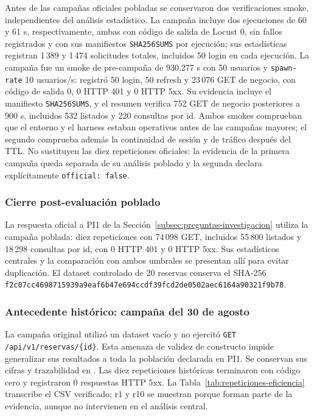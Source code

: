 Antes de las campañas oficiales pobladas se conservaron dos verificaciones
smoke, independientes del análisis estadístico. La campaña
incluye dos ejecuciones de 60 y 61 s, respectivamente, ambas con código de
salida de Locust 0, sin fallos registrados y con sus manifiestos
\texttt{SHA256SUMS} por ejecución; sus estadísticas registran 1\,389 y 1\,474
solicitudes totales, incluidos 50 login en cada ejecución. La campaña
fue un smoke de pre-campaña de 930,277 s con 50 usuarios y
\texttt{spawn-rate} 10 usuarios/s: registró 50 login, 50 refresh y 23\,076 GET
de negocio, con código de salida 0, 0 HTTP 401 y 0 HTTP 5xx. Su evidencia
incluye el manifiesto \texttt{SHA256SUMS}, y el resumen verifica 752 GET de
negocio posteriores a 900 s, incluidos 532 listados y 220 consultas por id.
Ambos smokes comprueban que el entorno y el harness estaban operativos antes
de las campañas mayores; el segundo comprueba además la continuidad de sesión
y de tráfico después del TTL. No sustituyen las diez repeticiones oficiales:
la evidencia de la primera campaña queda separada de su análisis poblado y la
segunda declara explícitamente \texttt{official: false}.

\subsubsection{Cierre post-evaluación poblado}

La respuesta oficial a PI1 de la
Sección~\ref{subsec:preguntas-investigacion} utiliza la campaña poblada:
diez repeticiones con 74\,098 GET, incluidos 55\,800 listados y 18\,298
consultas por id, con 0 HTTP 401 y 0 HTTP 5xx. Sus estadísticos centrales y
la comparación con ambos umbrales se presentan allí para evitar duplicación.
El dataset controlado de 20 reservas conserva el SHA-256
\texttt{f2c07cc4698715939a9eaf6b47e694ccdf39fcd2de0502aec6164a90321f9b78}.

\subsubsection{Antecedente histórico: campaña del 30 de agosto}

La campaña original utilizó un dataset vacío y no ejercitó
\texttt{GET /api/v1/reservas/\{id\}}. Esta amenaza de validez de constructo
impide generalizar sus resultados a toda la población declarada en PI1.
Se conservan sus cifras y trazabilidad en
.
Las diez repeticiones históricas terminaron con código cero y registraron 0 respuestas HTTP
5xx. La Tabla~\ref{tab:repeticiones-eficiencia} transcribe el CSV verificado; r1
y r10 se muestran porque forman parte de la evidencia, aunque no intervienen en
el análisis central.


